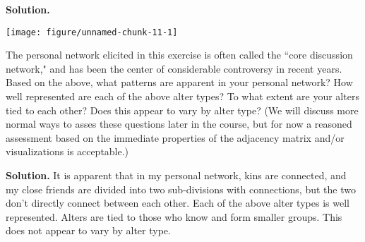 \documentclass[11pt, oneside]{article}\usepackage[]{graphicx}\usepackage[]{color}
\makeatletter
\def\maxwidth{ %
  \ifdim\Gin@nat@width>\linewidth
    \linewidth
  \else
    \Gin@nat@width
  \fi
}
\newenvironment{knitrout}{}{} %
\newenvironment{solution}{\begin{trivlist} \item \textbf{Solution.}}{\end{trivlist}}
\newenvironment{prob}[2][Problem]{\begin{trivlist}
\item[\hskip \labelsep {\bfseries #1}\hskip \labelsep {\bfseries #2.}]}{\end{trivlist}}
\makeatother
\begin{document}
\begin{prob}{1}
\begin{enumerate}
\begin{solution}
\begin{center}
\begin{knitrout}
{\centering \texttt{[image: figure/unnamed-chunk-11-1]} 

}



\end{knitrout}
\end{center}
\end{solution}

\item The personal network elicited in this exercise is often called the ``core discussion network," and has been the center of considerable controversy in recent years. Based on the above, what patterns are apparent in your personal network? How well represented are each of the above alter types? To what extent are your alters tied to each other? Does this appear to vary by alter type? (We will discuss more normal ways to asses these questions later in the course, but for now a reasoned assessment based on the immediate properties of the adjacency matrix and/or visualizations is acceptable.)

\begin{solution}
It is apparent that in my personal network, kins are connected, and my close friends are divided into two sub-divisions with connections, but the two don't directly connect between each other. Each of the above alter types is well represented. Alters are tied to those who know and form smaller groups. This does not appear to vary by alter type.
\end{solution}

\end{enumerate}

\end{prob}

 
\clearpage
\end{document}
